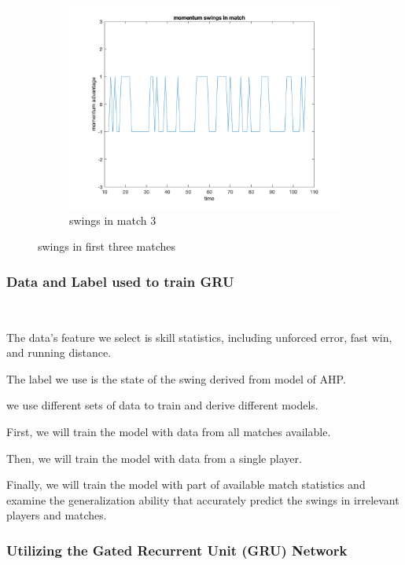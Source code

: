 \begin{figure}[H]
\begin{subfigure}[b]{0.34\textwidth}
        \includegraphics[width=\linewidth]{mainmatter/imgs/swing_match3.png}
        \caption{swings in match 3}
    \end{subfigure}
    \caption{swings in first three matches}
    \label{fig:swings in matches}
\end{figure}


\subsubsection{Data and Label used to train GRU}~{}

The data's feature we select is skill statistics, including unforced error, fast win, and running distance.

The label we use is the state of the swing derived from model of AHP.

we use different sets of data to train and derive different models.

First, we will train the model with data from all matches available.

Then, we will train the model with data from a single player.

Finally, we will train the model with part of available match statistics and examine
the generalization ability that accurately predict the swings in irrelevant players and matches.

\subsubsection{Utilizing the Gated Recurrent Unit (GRU) Network}~{}

